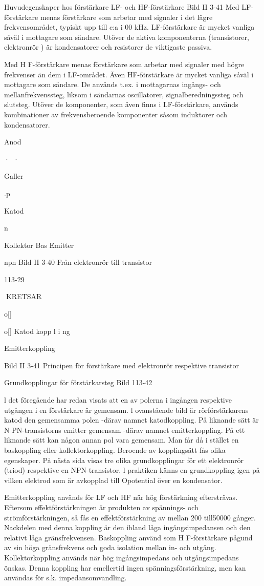 \documentclass[a4paper,twoside,twocolumn,openright]{book}
\begin{document}
{{{{{{{Huvudegenskaper hos förstärkare
LF- och HF-förstärkare
Bild II 3-41
Med LF-förstärkare menas förstärkare som
arbetar med signaler i det lägre frekvensområdet, typiskt upp till c:a i 00 kHz. LF-förstärkare är mycket vanliga såväl i mottagare
som sändare. Utöver de aktiva komponenterna (transistorer, elektronrör ) är kondensatorer och resistorer de viktigaste passiva.

Med H F-förstärkare menas förstärkare som
arbetar med signaler med högre frekvenser
än dem i LF-området. Även HF-förstärkare
är mycket vanliga såväl i mottagare som
sändare. De används t.ex. i mottagarnas
ingångs- och mellanfrekvenssteg, liksom i
sändarnas oscillatorer, signalberedningssteg
och slutsteg.
Utöver de komponenter, som även finns
i LF-förstärkare, används kombinationer av
frekvensberoende komponenter såsom
induktorer och kondensatorer.

Anod

·~·

Galler

.p

Katod

n

Kollektor
Bas
Emitter

npn
Bild II 3-40 Från elektronrör till transistor

113-29

KRETSAR

o[]

o[]
Katod kopp l i ng

Emitterkoppling

Bild II 3-41 Principen för förstärkare med elektronrör respektive transistor

Grundkopplingar för förstärkarsteg
Bild 113-42

l det föregående har redan visats att en av
polerna i ingången respektive utgången i en
förstärkare är gemensam. l ovanstående
bild är rörförstärkarens katod den gemensamma polen -därav namnet katodkoppling.
På liknande sätt är N PN-transistorns emitter
gemensam -därav namnet emitterkoppling.
På ett liknande sätt kan någon annan pol
vara gemensam. Man får då i stället en
baskoppling eller kollektorkoppling.
Beroende av kopplingsätt fås olika egenskaper. På nästa sida visas tre olika grundkopplingar för ett elektronrör (triod) respektive en NPN-transistor.
l praktiken känns en grundkoppling igen
på vilken elektrod som är avkopplad till Opotential över en kondensator.

Emitterkoppling används för LF och HF
när hög förstärkning eftersträvas. Eftersom
effektförstärkningen är produkten av
spännings- och strömförstärkningen, så fås
en effektförstärkning av mellan 200 till50000
gånger. Nackdelen med denna koppling är
den ibland låga ingångsimpedansen och
den relativt låga gränsfrekvensen.
Baskoppling använd som H F-förstärkare pågund av sin höga gränsfrekvens och
goda isolation mellan in- och utgång.
Kollektorkoppling används när hög ingångsimpedans och utgångsimpedans önskas. Denna koppling har emellertid ingen
spänningsförstärkning, men kan användas
för s.k. impedansomvandling.

}}}}}}}
\end{document}
